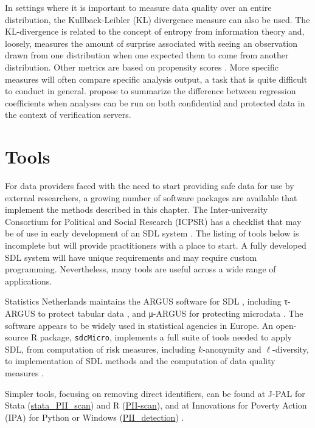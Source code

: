 In settings where it is important to measure data quality over an entire distribution, the Kullback-Leibler (KL) divergence measure can also be used. The KL-divergence is related to the concept of entropy from information theory and, loosely, measures the amount of surprise associated with seeing an observation drawn from one distribution when one expected them to come from another distribution. Other metrics are based on propensity scores \citep{woo_global_2009, snoke_general_2018}. More specific measures will often compare specific analysis output, a task that is quite difficult to conduct in general. \citet{reiter_verification_2009} propose to summarize the difference between regression coefficients when analyses can be run on both confidential and protected data in the context of verification servers.

\hypertarget{tools}{%
\section{Tools}\label{tools}}

For data providers faced with the need to start providing safe data for use by external researchers, a growing number of software packages are available that implement the methods described in this chapter. The Inter-university Consortium for Political and Social Research (ICPSR) has a checklist that may be of use in early development of an SDL system \citep{icpsr_disclosure_2020}. The listing of tools below is incomplete but will provide practitioners with a place to start. A fully developed SDL system will have unique requirements and may require custom programming. Nevertheless, many tools are useful across a wide range of applications.

Statistics Netherlands maintains the ARGUS software for SDL \citep{hundepool_argus_1998}, including τ-ARGUS to protect tabular data \citep{de_wolf_-argus_2018}, and μ-ARGUS for protecting microdata \citep{hundepool_-argus_2018}. The software appears to be widely used in statistical agencies in Europe. An open-source R package, \texttt{sdcMicro}, implements a full suite of tools needed to apply SDL, from computation of risk measures, including \(k\)-anonymity and \(\ell\)-diversity, to implementation of SDL methods and the computation of data quality measures \citetext{\citealp[ ]{templ_statistical_2015}; \citealp{templ_sdcmicro_2020}}.

Simpler tools, focusing on removing direct identifiers, can be found at J-PAL for Stata (\href{https://github.com/J-PAL/stata_PII_scan}{stata\_PII\_scan}) and R (\href{https://github.com/J-PAL/PII-Scan}{PII-scan}), and at Innovations for Poverty Action (IPA) for Python or Windows (\href{https://github.com/PovertyAction/PII_detection}{PII\_detection}) \citep{j-pal_j-palstata_pii_scan_2020, j-pal_j-palpii-scan_2020, innovations_for_poverty_action_povertyactionpii_detection_2020}.


